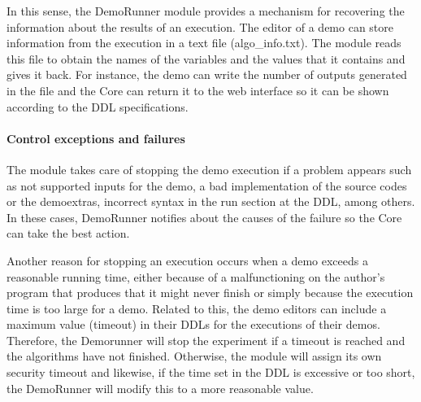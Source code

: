 In this sense, the DemoRunner module provides a mechanism for recovering the information about the results of an execution. The editor of a demo can store information from the execution in a text file (algo\_info.txt). The module reads this file to obtain the names of the variables and the values that it contains and gives it back. For instance, the demo can write the number of outputs generated in the file and the Core can return it to the web interface so it can be shown according to the DDL specifications.

\paragraph{Control exceptions and failures}
\noindent

The module takes care of stopping the demo execution if a problem appears such as not supported inputs for the demo, a bad implementation of the source codes or the demoextras, incorrect syntax in the run section at the DDL, among others. In these cases, DemoRunner notifies about the causes of the failure so the Core can take the best action. 

Another reason for stopping an execution occurs when a demo exceeds a reasonable running time, either because of a malfunctioning on the author's program that produces that it might never finish or simply because the execution time is too large for a demo. Related to this, the demo editors can include a maximum value (timeout) in their DDLs for the executions of their demos. Therefore, the Demorunner will stop the experiment if a timeout is reached and the algorithms have not finished. Otherwise, the module will assign its own security timeout and likewise, if the time set in the DDL is excessive or too short, the DemoRunner will modify this to a more reasonable value.
